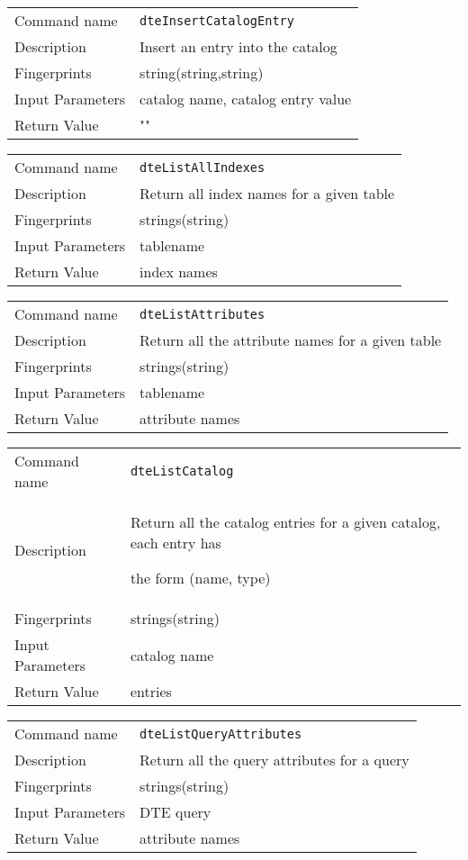 \noindent
\begin{tabular}{l|p{5in}}
\hline
Command name &{\tt dteInsertCatalogEntry }\\ 
Description &
Insert an entry into the catalog 
 	\\
Fingerprints & string(string,string)\\
Input Parameters& catalog name, catalog entry value\\
Return Value&""\\
\hline
\end{tabular}
\bigskip

\noindent
\begin{tabular}{l|p{5in}}
\hline
Command name &{\tt dteListAllIndexes }\\ 
Description &
Return all index names for a given table
 	\\
Fingerprints & strings(string)\\
Input Parameters&tablename\\
Return Value&index names\\
\hline
\end{tabular}
\bigskip

\noindent
\begin{tabular}{l|p{5in}}
\hline
Command name &{\tt dteListAttributes }\\ 
Description &
Return all the attribute names for a given table
 	\\
Fingerprints & strings(string)\\
Input Parameters&tablename\\
Return Value&attribute names\\
\hline
\end{tabular}
\bigskip

\noindent
\begin{tabular}{l|p{5in}}
\hline
Command name &{\tt dteListCatalog }\\ 
Description &
Return all the catalog entries for a given catalog, each entry has
 
the form (name, type)
 	\\
Fingerprints & strings(string)\\
Input Parameters&catalog name\\
Return Value&entries\\
\hline
\end{tabular}
\bigskip

\noindent
\begin{tabular}{l|p{5in}}
\hline
Command name &{\tt dteListQueryAttributes }\\ 
Description &
Return all the query attributes for a query
 	\\
Fingerprints & strings(string)\\
Input Parameters&DTE query\\
Return Value&attribute names\\
\hline
\end{tabular}
\bigskip

